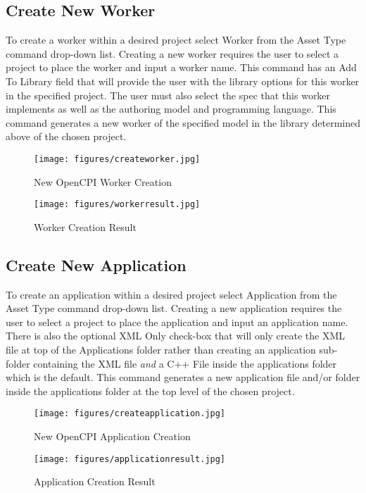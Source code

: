 \newpage

\subsection{Create New Worker}
\label{sec:create_worker}
\begin{flushleft}

To create a worker within a desired project select Worker from the Asset Type command drop-down list. Creating a new worker requires the user to select a project to place the worker and input a worker name. This command has an Add To Library field that will provide the user with the library options for this worker in the specified project. The user must also select the spec that this worker implements as well as the authoring model and programming language. This command generates a new worker of the specified model in the library determined above of the chosen project.\newline
\begin{figure}[h!]
  \centering
  \texttt{[image: figures/createworker.jpg]}
  \caption{New OpenCPI Worker Creation}
  \label{fig:figure10}
\end{figure}

\begin{figure}[h!]
  \centering
  \texttt{[image: figures/workerresult.jpg]}
  \caption{Worker Creation Result}
  \label{fig:figure11}
\end{figure}

\end{flushleft}

\newpage

\subsection{Create New Application}
\label{sec:create_application}
\begin{flushleft}

To create an application within a desired project select Application from the Asset Type command drop-down list. Creating a new application requires the user to select a project to place the application and input an application name. There is also the optional XML Only check-box that will only create the XML file at top of the Applications folder rather than creating an application sub-folder containing the XML file \textit{and} a C++ File inside the applications folder which is the default. This command generates a new application file and/or folder inside the applications folder at the top level of the chosen project.\newline
\begin{figure}[h!]
  \centering
  \texttt{[image: figures/createapplication.jpg]}
  \caption{New OpenCPI Application Creation}
  \label{fig:figure12}
\end{figure}

\begin{figure}[h!]
  \centering
  \texttt{[image: figures/applicationresult.jpg]}
  \caption{Application Creation Result}
  \label{fig:figure13}
\end{figure}

\end{flushleft}

